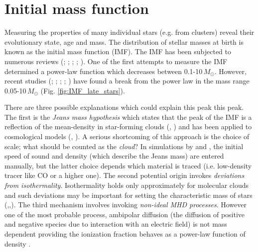 \iffalse
\section{Initial mass function}

Measuring the properties of many individual stars (e.g. from clusters) reveal their evolutionary state, age and mass. The distribution of stellar masses at birth is known as the initial mass function (IMF). The IMF has been subjected to numerous reviews (\citealt{2010ARA&A..48..339B}; \citealt{2012EAS....57...45J}; \citealt{2013pss5.book..115K}; \citealt{2014prpl.conf...53O}; \citealt{2017ApJ...841...68V}). One of the first attempts to measure the IMF determined a power-law function which decreases between 0.1-10\,$M_\odot$. However, recent studies (\citealt{2000ApJ...544.1044L};
\citealt{2000ApJ...540.1016L}; 
\citealt{2014prpl.conf...53O};
\citealt{2003PASP..115..763C};
\citealt{2006ApJ...640L..63L}) have found a break from the power law in the mass range 0.05-10\,$M_\odot$ (Fig. \ref{fig:IMF_late_stars}). 


There are three possible explanations which could explain this peak this peak. The first is the \textit{Jeans mass hypothesis} which states that the peak of the IMF is a reflection of the mean-density in star-forming clouds (\citealt{1992MNRAS.256..641L}, \citealt{2005MNRAS.356.1201B}) and has been applied to cosmological models (\citealt{2007ApJ...668..667T}, \citealt{2012MNRAS.423.3601N}). A serious shortcoming of this approach is the choice of scale; what should be counted as the \textit{cloud}? In simulations by \citet{2007ApJ...668..667T} and  \citet{2012MNRAS.423.3601N}, the initial speed of sound and density (which describe the Jeans mass) are entered manually, but the latter choice depends which material is traced (i.e. low-density tracer like CO or a higher one). The second potential origin invokes \textit{deviations from isothermality}. Isothermality holds only approximately for molecular clouds and such deviations may be important for setting the characteristic mass of stars (\citealt{2001BpJ....81.2020G},\citealt{2007PASJ...59..589O},\citealt{2013A&A...557A..90V}). The third mechanism involves invoking \textit{non-ideal MHD processes}. However one of the most probable process, ambipolar diffusion (the diffusion of positive and negative species due to interaction with an electric field) is not mass dependent providing the ionization fraction behaves as a power-law function of density \citep{2010ApJ...709..308M}.

